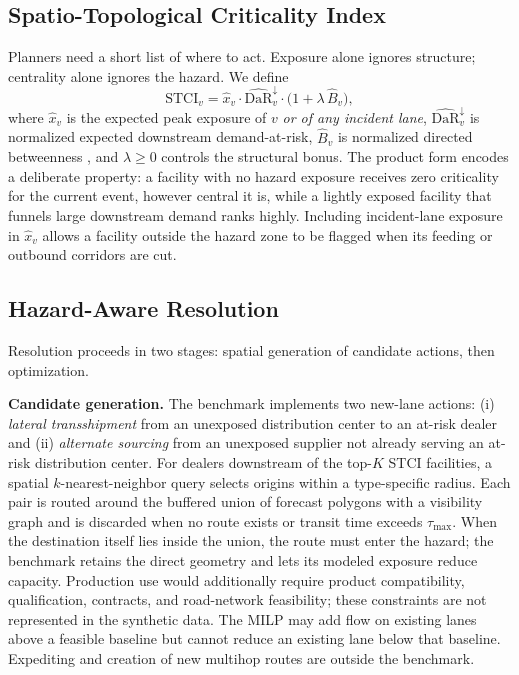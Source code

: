 \documentclass[conference]{IEEEtran}
\begin{document}
\subsection{Spatio-Topological Criticality Index}\label{sec:stci}
Planners need a short list of where to act. Exposure alone ignores
structure; centrality alone ignores the hazard. We define
\begin{equation}
\mathrm{STCI}_v = \hat{x}_v \cdot \widehat{\mathrm{DaR}}^{\downarrow}_v
\cdot \bigl(1 + \lambda\,\hat{B}_v\bigr),
\label{eq:stci}
\end{equation}
where $\hat{x}_v$ is the expected peak exposure of $v$ \emph{or of any
incident lane}, $\widehat{\mathrm{DaR}}^{\downarrow}_v$ is normalized
expected downstream demand-at-risk, $\hat{B}_v$ is normalized directed
betweenness \cite{brandes2001}, and $\lambda\ge0$ controls
the structural bonus. The product form encodes a deliberate property:
a facility with no hazard exposure receives zero criticality for the
current event, however central it is, while a lightly exposed facility
that funnels large downstream demand ranks highly. Including incident-lane
exposure in $\hat{x}_v$ allows a facility outside the hazard zone to be
flagged when its feeding or outbound corridors are cut.

\subsection{Hazard-Aware Resolution}\label{sec:resolve}
Resolution proceeds in two stages: spatial generation of candidate
actions, then optimization.

\textbf{Candidate generation.} The benchmark implements two new-lane
actions: (i) \emph{lateral transshipment} from an unexposed distribution
center to an at-risk dealer and (ii) \emph{alternate sourcing} from an
unexposed supplier not already serving an at-risk distribution center.
For dealers downstream of the top-$K$ STCI facilities, a spatial
$k$-nearest-neighbor query selects origins within a type-specific radius.
Each pair is routed around the buffered union of forecast polygons with a
visibility graph and is discarded when no route exists or transit time
exceeds $\tau_{\max}$. When the destination itself lies inside the union,
the route must enter the hazard; the benchmark retains the direct geometry
and lets its modeled exposure reduce capacity. Production use would additionally require product
compatibility, qualification, contracts, and road-network feasibility;
these constraints are not represented in the synthetic data. The MILP
may add flow on existing lanes above a feasible baseline but cannot reduce
an existing lane below that baseline. Expediting and creation of
new multihop routes are outside the benchmark.
\end{document}
